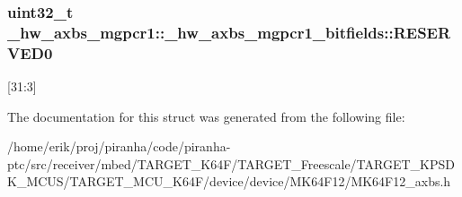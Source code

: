 \subsubsection[{\texorpdfstring{R\+E\+S\+E\+R\+V\+E\+D0}{RESERVED0}}]{\setlength{\rightskip}{0pt plus 5cm}uint32\+\_\+t \+\_\+hw\+\_\+axbs\+\_\+mgpcr1\+::\+\_\+hw\+\_\+axbs\+\_\+mgpcr1\+\_\+bitfields\+::\+R\+E\+S\+E\+R\+V\+E\+D0}\hypertarget{struct__hw__axbs__mgpcr1_1_1__hw__axbs__mgpcr1__bitfields_ae6a5c248feb2440e8a0cf6d95cbf72bd}{}\label{struct__hw__axbs__mgpcr1_1_1__hw__axbs__mgpcr1__bitfields_ae6a5c248feb2440e8a0cf6d95cbf72bd}
\mbox{[}31\+:3\mbox{]} 

The documentation for this struct was generated from the following file\+:\begin{DoxyCompactItemize}
\item 
/home/erik/proj/piranha/code/piranha-\/ptc/src/receiver/mbed/\+T\+A\+R\+G\+E\+T\+\_\+\+K64\+F/\+T\+A\+R\+G\+E\+T\+\_\+\+Freescale/\+T\+A\+R\+G\+E\+T\+\_\+\+K\+P\+S\+D\+K\+\_\+\+M\+C\+U\+S/\+T\+A\+R\+G\+E\+T\+\_\+\+M\+C\+U\+\_\+\+K64\+F/device/device/\+M\+K64\+F12/M\+K64\+F12\+\_\+axbs.\+h\end{DoxyCompactItemize}
